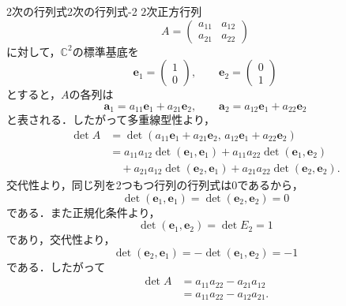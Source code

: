 \begin{example}{2次の行列式}{2次の行列式-2}
  $2$次正方行列
  \[
    A=
    \begin{pmatrix}
      a_{11} & a_{12}\\
      a_{21} & a_{22}
    \end{pmatrix}
  \]
  に対して，$\mathbb{C}^2$の標準基底を
  \[
    \bm{e}_1=
    \begin{pmatrix}
      1\\0
    \end{pmatrix},
    \qquad
    \bm{e}_2=
    \begin{pmatrix}
      0\\1
    \end{pmatrix}
  \]
  とすると，$A$の各列は
  \[
    \bm{a}_1=a_{11}\bm{e}_1+a_{21}\bm{e}_2,
    \qquad
    \bm{a}_2=a_{12}\bm{e}_1+a_{22}\bm{e}_2
  \]
  と表される．したがって多重線型性より，
  \begin{align*}
    \det A
    &=
    \det
    \left(
      a_{11}\bm{e}_1+a_{21}\bm{e}_2,\,
      a_{12}\bm{e}_1+a_{22}\bm{e}_2
    \right)\\
    &=
    a_{11}a_{12}\det(\bm{e}_1,\bm{e}_1)
    +a_{11}a_{22}\det(\bm{e}_1,\bm{e}_2)\\
    &\quad
    +a_{21}a_{12}\det(\bm{e}_2,\bm{e}_1)
    +a_{21}a_{22}\det(\bm{e}_2,\bm{e}_2).
  \end{align*}
  交代性より，同じ列を2つもつ行列の行列式は$0$であるから，
  \[
    \det(\bm{e}_1,\bm{e}_1)
    =
    \det(\bm{e}_2,\bm{e}_2)
    =0
  \]
  である．また正規化条件より，
  \[
    \det(\bm{e}_1,\bm{e}_2)
    =\det E_2
    =1
  \]
  であり，交代性より，
  \[
    \det(\bm{e}_2,\bm{e}_1)
    =-\det(\bm{e}_1,\bm{e}_2)
    =-1
  \]
  である．したがって
  \begin{align*}
    \det A
    &=a_{11}a_{22}-a_{21}a_{12}\\
    &=a_{11}a_{22}-a_{12}a_{21}.
  \end{align*}
\end{example}

